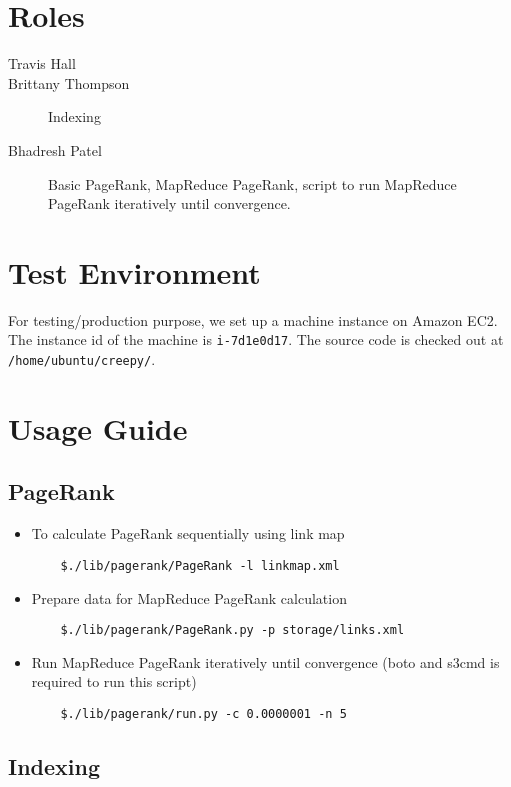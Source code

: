 \documentclass[letterpaper,11pt,twoside]{article}
\begin{document}
\section{Roles}
\begin{description}
 \item[Travis Hall] 
 \item[Brittany Thompson] Indexing
 \item[Bhadresh Patel] Basic PageRank, MapReduce PageRank, script to run MapReduce PageRank iteratively until convergence.
\end{description}

\section{Test Environment}
For testing/production purpose, we set up a machine instance on Amazon EC2. The instance id of the machine is \texttt{i-7d1e0d17}. The source code is checked out at \texttt{/home/ubuntu/creepy/}.

\section{Usage Guide}

\subsection{PageRank}
\begin{itemize}
	\item To calculate PageRank sequentially using link map
\begin{verbatim}
	$./lib/pagerank/PageRank -l linkmap.xml
\end{verbatim}

	\item Prepare data for MapReduce PageRank calculation
\begin{verbatim}
	$./lib/pagerank/PageRank.py -p storage/links.xml
\end{verbatim}
	
	\item Run MapReduce PageRank iteratively until convergence (boto and s3cmd is required to run this script)
\begin{verbatim}
	$./lib/pagerank/run.py -c 0.0000001 -n 5
\end{verbatim}
\end{itemize}
\subsection{Indexing}
\end{document}
